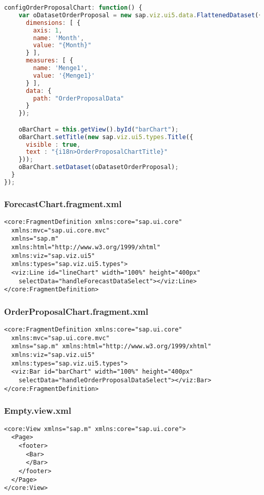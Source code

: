 \begin{lstlisting}[language=JavaScript, label=lst:Detail.controller.js]
  configOrderProposalChart: function() {
    var oDatasetOrderProposal = new sap.viz.ui5.data.FlattenedDataset({
      dimensions: [ {
        axis: 1,
        name: 'Month',
        value: "{Month}"
      } ],
      measures: [ {
        name: 'Menge1',
        value: '{Menge1}'
      } ],
      data: {
        path: "OrderProposalData"
      }
    });

    oBarChart = this.getView().byId("barChart");
    oBarChart.setTitle(new sap.viz.ui5.types.Title({
      visible : true,
      text : "{i18n>OrderProposalChartTitle}"
    }));
    oBarChart.setDataset(oDatasetOrderProposal);
  }
});
\end{lstlisting}

\subsubsection*{ForecastChart.fragment.xml}
\begin{lstlisting}[language=HTML5, label=lst:ForecastChart.fragment.xml]
<core:FragmentDefinition xmlns:core="sap.ui.core"
  xmlns:mvc="sap.ui.core.mvc" 
  xmlns="sap.m" 
  xmlns:html="http://www.w3.org/1999/xhtml"
  xmlns:viz="sap.viz.ui5" 
  xmlns:types="sap.viz.ui5.types">
  <viz:Line id="lineChart" width="100%" height="400px"
    selectData="handleForecastDataSelect"></viz:Line>
</core:FragmentDefinition>
\end{lstlisting}

\subsubsection*{OrderProposalChart.fragment.xml}
\begin{lstlisting}[language=HTML5, label=OrderProposalChart.fragment.xml]
<core:FragmentDefinition xmlns:core="sap.ui.core"
  xmlns:mvc="sap.ui.core.mvc" 
  xmlns="sap.m" xmlns:html="http://www.w3.org/1999/xhtml"
  xmlns:viz="sap.viz.ui5" 
  xmlns:types="sap.viz.ui5.types">
  <viz:Bar id="barChart" width="100%" height="400px"
    selectData="handleOrderProposalDataSelect"></viz:Bar>
</core:FragmentDefinition>
\end{lstlisting}

\subsubsection*{Empty.view.xml}
\begin{lstlisting}[language=HTML5, label=lst:Empty.view.xml]
<core:View xmlns="sap.m" xmlns:core="sap.ui.core">
  <Page>
    <footer>
      <Bar>
      </Bar>
    </footer>
  </Page>
</core:View>
\end{lstlisting}

